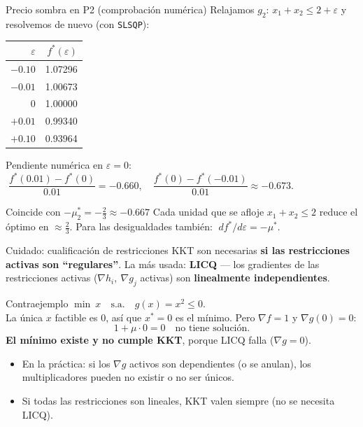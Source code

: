 \documentclass[aspectratio=169]{beamer}
\newcommand{\grad}{\nabla}
\newcommand{\xs}{x^\ast}
\begin{document}
\begin{frame}{Precio sombra en P2 (comprobación numérica)}
  Relajamos $g_2$: $x_1+x_2\le 2+\varepsilon$ y resolvemos de nuevo (con \texttt{SLSQP}):
  \begin{center}\small
  \begin{tabular}{rr}
    \toprule
    $\varepsilon$ & $f^\ast(\varepsilon)$\\
    \midrule
    $-0.10$ & 1.07296\\
    $-0.01$ & 1.00673\\
    $0$ & 1.00000\\
    $+0.01$ & 0.99340\\
    $+0.10$ & 0.93964\\
    \bottomrule
  \end{tabular}
  \end{center}
  Pendiente numérica en $\varepsilon=0$: $\;\dfrac{f^\ast(0.01)-f^\ast(0)}{0.01}=-0.660,\quad \dfrac{f^\ast(0)-f^\ast(-0.01)}{0.01}\approx-0.673$.
  \begin{alertblock}{Coincide con $-\mu_2^\ast=-\tfrac23\approx-0.667$}
    Cada unidad que se afloje $x_1+x_2\le 2$ reduce el óptimo en $\approx\tfrac23$. Para las desigualdades también: $\;df^\ast/d\varepsilon=-\mu^\ast$.
  \end{alertblock}
\end{frame}

\begin{frame}{Cuidado: cualificación de restricciones}
  KKT son necesarias \textbf{si las restricciones activas son ``regulares''}. La más usada: \textbf{LICQ} --- los gradientes de las restricciones activas ($\grad h_i,\ \grad g_j$ activas) son \textbf{linealmente independientes}.
  \begin{exampleblock}{Contraejemplo}
    $\min\ x\quad\text{s.a.}\quad g(x)=x^2\le 0$.\\
    La única $x$ factible es $0$, así que $\xs=0$ es el mínimo. Pero $\grad f=1$ y $\grad g(0)=0$:
    \[ 1+\mu\cdot 0=0\quad\text{no tiene solución.}\]
    \textbf{El mínimo existe y no cumple KKT}, porque LICQ falla ($\grad g=0$).
  \end{exampleblock}
  \begin{itemize}
    \item En la práctica: si los $\grad g$ activos son dependientes (o se anulan), los multiplicadores pueden no existir o no ser únicos.
    \item Si todas las restricciones son lineales, KKT valen siempre (no se necesita LICQ).
  \end{itemize}
\end{frame}
\end{document}
